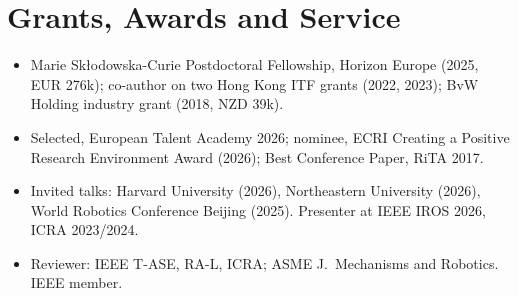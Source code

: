 \documentclass[10pt,a4paper]{article}
\begin{document}
\section*{Grants, Awards and Service}
\begin{itemize}
  \item Marie Sk\l{}odowska-Curie Postdoctoral Fellowship, Horizon Europe (2025, EUR 276k); co-author on two Hong Kong ITF grants (2022, 2023); BvW Holding industry grant (2018, NZD 39k).
  \item Selected, European Talent Academy 2026; nominee, ECRI Creating a Positive Research Environment Award (2026); Best Conference Paper, RiTA 2017.
  \item Invited talks: Harvard University (2026), Northeastern University (2026), World Robotics Conference Beijing (2025). Presenter at IEEE IROS 2026, ICRA 2023/2024.
  \item Reviewer: IEEE T-ASE, RA-L, ICRA; ASME J.\ Mechanisms and Robotics. IEEE member.
\end{itemize}
\end{document}
